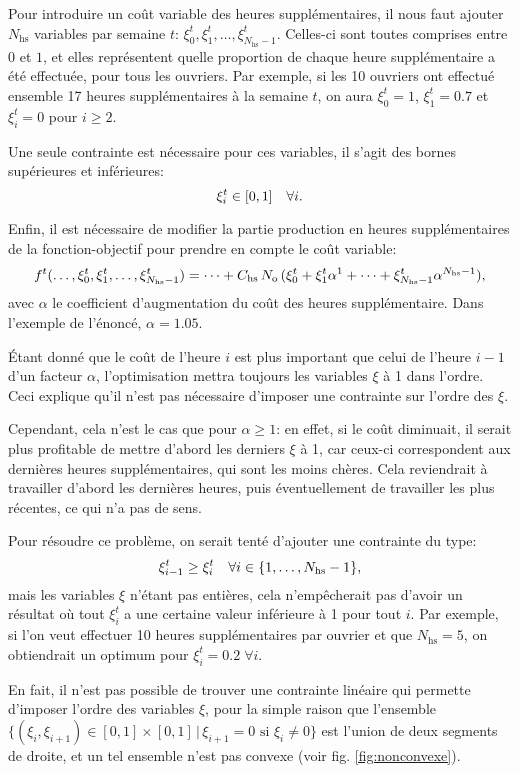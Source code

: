 Pour introduire un coût variable des heures supplémentaires, il nous faut ajouter $N_\mathrm{hs}$ variables par semaine $t$: $\xi_0^t, \xi_1^t, \dots, \xi_{N_\mathrm{hs}-1}^t$. Celles-ci sont toutes comprises entre $0$ et $1$, et elles représentent quelle proportion de chaque heure supplémentaire a été effectuée, pour tous les ouvriers.
Par exemple, si les 10 ouvriers ont effectué ensemble 17 heures supplémentaires à la semaine $t$, on aura $\xi_0^t = 1$, $\xi_1^t = 0.7$ et $\xi_i^t = 0$ pour $i \geq 2$.

Une seule contrainte est nécessaire pour ces variables, il s'agit des bornes supérieures et inférieures:
\[
    \xi_i^t \in [0, 1]
    \quad\forall i
    \text.
\]

Enfin, il est nécessaire de modifier la partie \og{}production en heures supplémentaires\fg{} de la fonction-objectif pour prendre en compte le coût variable:
\[
    f^t(\dots, \xi_0^t, \xi_1^t, \dots, \xi_{N_\mathrm{hs}-1}^t)
    = \dots + C_\mathrm{hs}\,N_\mathrm{o}\,(\xi_0^t + \xi_1^t \alpha^1 + \dots + \xi_{N_\mathrm{hs}-1}^t \alpha^{N_\mathrm{hs}-1})
    \text,
\]
avec $\alpha$ le coefficient d'augmentation du coût des heures supplémentaire. Dans l'exemple de l'énoncé, $\alpha = 1.05$.

Étant donné que le coût de l'heure $i$ est plus important que celui de l'heure $i-1$ d'un facteur $\alpha$, l'optimisation mettra toujours les variables $\xi$ à 1 dans l'ordre. Ceci explique qu'il n'est pas nécessaire d'imposer une contrainte sur l'ordre des $\xi$.

Cependant, cela n'est le cas que pour $\alpha \geq 1$: en effet, si le coût diminuait, il serait plus profitable de mettre d'abord les derniers $\xi$ à 1, car ceux-ci correspondent aux dernières heures supplémentaires, qui sont les moins chères. Cela reviendrait à travailler d'abord les dernières heures, puis éventuellement de travailler les plus récentes, ce qui n'a pas de sens.

Pour résoudre ce problème, on serait tenté d'ajouter une contrainte du type:
\[
    \xi_{i-1}^t \geq \xi_i^t \quad\forall i \in \{1,\dots, N_\mathrm{hs}-1\}
    \text,
\]
mais les variables $\xi$ n'étant pas entières, cela n'empêcherait pas d'avoir un résultat où tout $\xi_i^t$ a une certaine valeur inférieure à 1 pour tout $i$. Par exemple, si l'on veut effectuer 10 heures supplémentaires par ouvrier et que $N_\mathrm{hs} = 5$, on obtiendrait un optimum pour $\xi_i^t = 0.2 \;\forall i$.

En fait, il n'est pas possible de trouver une contrainte linéaire qui permette d'imposer l'ordre des variables $\xi$, pour la simple raison que l'ensemble $\{(\xi_i, \xi_{i+1}) \in [0, 1]\!\times\![0, 1] \,|\, \xi_{i+1} = 0 \text{ si } \xi_i \neq 0\}$ est l'union de deux segments de droite, et un tel ensemble n'est pas convexe (voir fig. \ref{fig:nonconvexe}).

